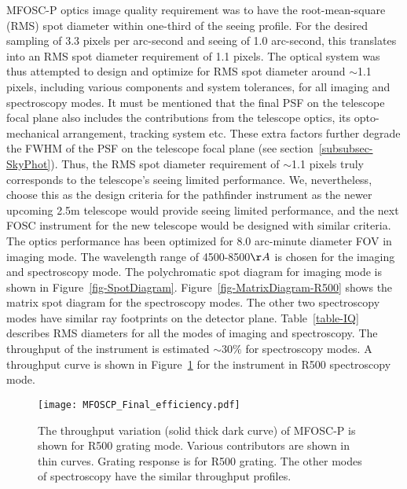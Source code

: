 MFOSC-P optics image quality requirement was to have the root-mean-square (RMS) spot diameter within one-third of the seeing profile. For the desired sampling of 3.3 pixels per arc-second and seeing of 1.0 arc-second, this translates into an RMS spot diameter requirement of 1.1 pixels. The optical system was thus attempted to design and optimize for RMS spot diameter around $\sim$1.1 pixels, including various components and system tolerances, for all imaging and spectroscopy modes. It must be mentioned that the final PSF on the telescope focal plane also includes the contributions from the telescope optics, its opto-mechanical arrangement, tracking system etc. These extra factors further degrade the FWHM of the PSF on the telescope focal plane (see section~\ref{subsubsec-SkyPhot}). Thus, the RMS spot diameter requirement of $\sim$1.1 pixels truly corresponds to the telescope's seeing limited performance. We, nevertheless, choose this as the design criteria for the pathfinder instrument as the newer upcoming 2.5m telescope would provide seeing limited performance, and the next FOSC instrument for the new telescope would be designed with similar criteria. The optics performance has been optimized for 8.0 arc-minute diameter FOV in imaging mode. The wavelength range of 4500-8500$\AA$ is chosen for the imaging and spectroscopy mode. The polychromatic spot diagram for imaging mode is shown in Figure~\ref{fig-SpotDiagram}. Figure~\ref{fig-MatrixDiagram-R500} shows the matrix spot diagram for the spectroscopy modes. The other two spectroscopy modes have similar ray footprints on the detector plane. Table~\ref{table-IQ} describes RMS diameters for all the modes of imaging and spectroscopy. The throughput of the instrument is estimated $\sim30\%$ for spectroscopy modes. A throughput curve is shown in Figure~\ref{fig-Throughput} for the instrument in R500 spectroscopy mode.

\par 

\begin{figure}
	\centering
	\texttt{[image: MFOSCP\_Final\_efficiency.pdf]}
	\vspace{0.2cm}
	\caption{The throughput variation (solid thick dark curve) of MFOSC-P is shown for R500 grating mode. Various contributors are shown in thin curves. Grating response is for R500 grating. The other modes of spectroscopy have the similar throughput profiles.}
	\label{fig-Throughput}
\end{figure}


